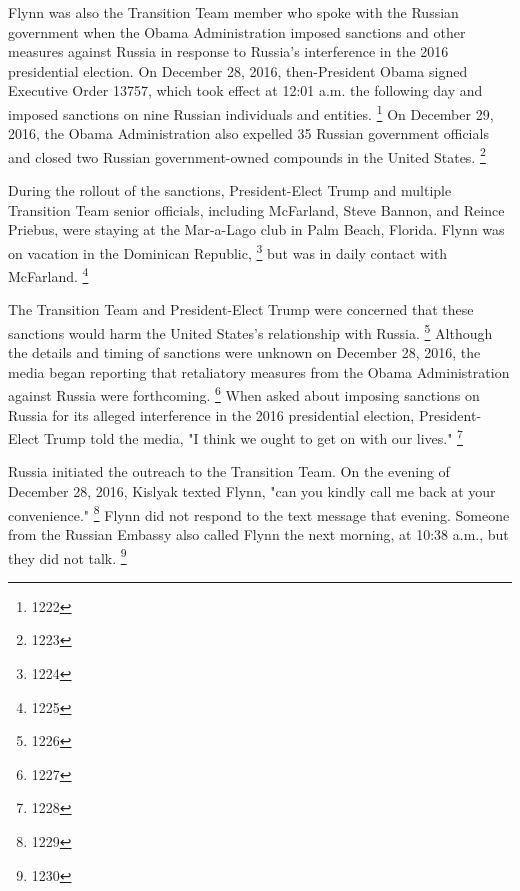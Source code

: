 Flynn was also the Transition Team member who spoke with the Russian government when the Obama Administration imposed sanctions and other measures against Russia in response to Russia's interference in the 2016 presidential election.
On December 28, 2016, then-President Obama signed Executive Order 13757, which took effect at 12:01 a.m. the following day and imposed sanctions on nine Russian individuals and entities.%
\footnote{1222}
On December 29, 2016, the Obama Administration also expelled 35 Russian government officials and closed two Russian government-owned compounds in the United States.%
\footnote{1223}

During the rollout of the sanctions, President-Elect Trump and multiple Transition Team senior officials, including McFarland, Steve Bannon, and Reince Priebus, were staying at the Mar-a-Lago club in Palm Beach, Florida.
Flynn was on vacation in the Dominican Republic,%
\footnote{1224}
but was in daily contact with McFarland.%
\footnote{1225}

The Transition Team and President-Elect Trump were concerned that these sanctions would harm the United States's relationship with Russia.%
\footnote{1226}
Although the details and timing of sanctions were unknown on December 28, 2016, the media began reporting that retaliatory measures from the Obama Administration against Russia were forthcoming.%
\footnote{1227}
When asked about imposing sanctions on Russia for its alleged interference in the 2016 presidential election, President-Elect Trump told the media, "I think we ought to get on with our lives."%
\footnote{1228}

Russia initiated the outreach to the Transition Team.
On the evening of December 28, 2016, Kislyak texted Flynn, "can you kindly call me back at your convenience."%
\footnote{1229}
Flynn did not respond to the text message that evening.
Someone from the Russian Embassy also called Flynn the next morning, at 10:38 a.m., but they did not talk.%
\footnote{1230}

